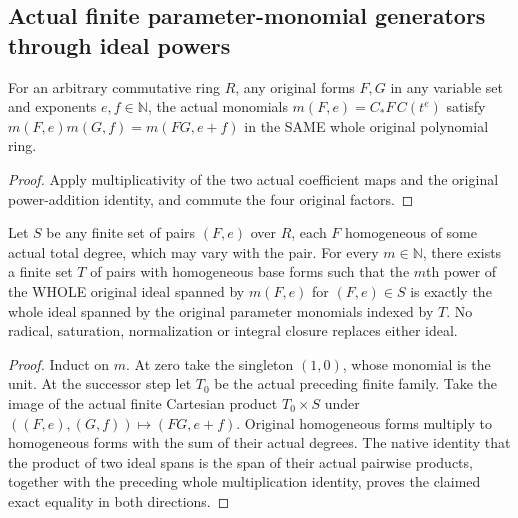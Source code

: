 \subsection{Actual finite parameter-monomial generators through ideal powers}

\begin{lemma}
\label{local:actual-parameter-monomial-multiplication}
\leanok
For an arbitrary commutative ring $R$, any original forms $F,G$ in any
variable set and exponents $e,f\in\mathbb N$, the actual monomials
$m(F,e)=C_*F\,C(t^e)$ satisfy
$m(F,e)m(G,f)=m(FG,e+f)$ in the SAME whole original polynomial ring.
\end{lemma}
\begin{proof}
Apply multiplicativity of the two actual coefficient maps and the
original power-addition identity, and commute the four original factors.
\end{proof}

\begin{theorem}
\label{local:actual-finite-parameter-monomial-powers}
\leanok
{}
Let $S$ be any finite set of pairs $(F,e)$ over $R$, each $F$ homogeneous
of some actual total degree, which may vary with the pair. For every
$m\in\mathbb N$, there exists a finite set $T$ of pairs with homogeneous
base forms such that the $m$th power of the WHOLE original ideal spanned
by $m(F,e)$ for $(F,e)\in S$ is exactly the whole ideal spanned by the
original parameter monomials indexed by $T$. No radical, saturation,
normalization or integral closure replaces either ideal.
\end{theorem}
\begin{proof}
Induct on $m$. At zero take the singleton $(1,0)$, whose monomial is the
unit. At the successor step let $T_0$ be the actual preceding finite
family. Take the image of the actual finite Cartesian product $T_0\times S$
under $((F,e),(G,f))\mapsto(FG,e+f)$. Original homogeneous forms multiply
to homogeneous forms with the sum of their actual degrees. The native
identity that the product of two ideal spans is the span of their actual
pairwise products, together with the preceding whole multiplication
identity, proves the claimed exact equality in both directions.
\end{proof}

